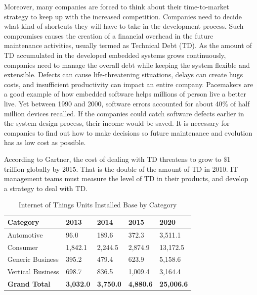 Moreover, many companies are forced to think about their time-to-market strategy to keep up with the increased competition. Companies need to decide what kind of shortcuts they will have to take in the development process. Such compromises causes the creation of a financial overhead in the future maintenance activities, usually termed as Technical Debt (TD)\cite{p29-cunningham}. As the amount of TD accumulated in the developed embedded systems grows continuously, companies need to manage the overall debt while keeping the system flexible and extensible. Defects can cause life-threatening situations, delays can create hugs costs, and insufficient productivity can impact an entire company\cite{ebert2009embedded}. Pacemakers are a good example of how embedded software helps millions of person live a better live. Yet between 1990 and 2000, software errors accounted for about 40\% of half million devices recalled\cite{ebert2009embedded}. If the companies could catch software defects earlier in the system design process, their income would be saved. It is necessary for companies to find out how to make decisions so future maintenance and evolution has as low cost as possible. 

According to Gartner\cite{gartner2010}, the cost of dealing with TD threatens to grow to \$1 trillion globally by 2015. That is the double of the amount of TD in 2010. IT management teams must measure the level of TD in their products, and develop a strategy to deal with TD.



\begin{table}[H]
	\centering
	\begin{tabular}{ | l | l | l | l | l |}
	\hline
	\textbf{Category} & \textbf{2013} & \textbf{2014} & \textbf{2015} & \textbf{2020} \\ \hline
	Automotive & 96.0 & 189.6 & 372.3 & 3,511.1 \\ \hline
	Consumer & 1,842.1 & 2,244.5 & 2,874.9 & 13,172.5 \\ \hline
	Generic Business & 395.2 & 479.4 & 623.9 & 5,158.6 \\ \hline
	Vertical Business & 698.7 & 836.5 & 1,009.4 & 3,164.4 \\ \hline
	\textbf{Grand Total} & \textbf{3,032.0} & \textbf{3,750.0} & \textbf{4,880.6} & \textbf{25,006.6} \\
	\hline
	\end{tabular}
	\caption{Internet of Things Units Installed Base by Category\cite{gartner}} \label{tab:table1}
\end{table}



